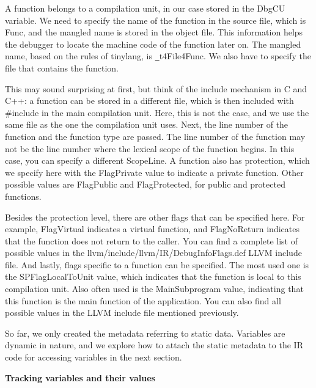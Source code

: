 A function belongs to a compilation unit, in our case stored in the DbgCU variable. We need to specify the name of the function in the source file, which is Func, and the mangled name is stored in the object file. This information helps the debugger to locate the machine code of the function later on. The mangled name, based on the rules of tinylang, is \underline{~}t4File4Func. We also have to specify the file that contains the function.\par

This may sound surprising at first, but think of the include mechanism in C and C++: a function can be stored in a different file, which is then included with #include in the main compilation unit. Here, this is not the case, and we use the same file as the one the compilation unit uses. Next, the line number of the function and the function type are passed. The line number of the function may not be the line number where the lexical scope of the function begins. In this case, you can specify a different ScopeLine. A function also has protection, which we specify here with the FlagPrivate value to indicate a private function. Other possible values are FlagPublic and FlagProtected, for public and protected functions.\par

Besides the protection level, there are other flags that can be specified here. For example, FlagVirtual indicates a virtual function, and FlagNoReturn indicates that the function does not return to the caller. You can find a complete list of possible values in the llvm/include/llvm/IR/DebugInfoFlags.def LLVM include file. And lastly, flags specific to a function can be specified. The most used one is the SPFlagLocalToUnit value, which indicates that the function is local to this compilation unit. Also often used is the MainSubprogram value, indicating that this function is the main function of the application. You can also find all possible values in the LLVM include file mentioned previously.\par

So far, we only created the metadata referring to static data. Variables are dynamic in nature, and we explore how to attach the static metadata to the IR code for accessing variables in the next section.\par

\hspace*{\fill} \par %
\textbf{Tracking variables and their values}

